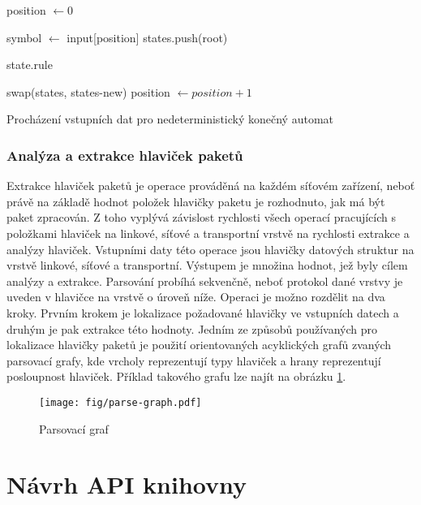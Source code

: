 \begin{algorithm}
    position $\leftarrow 0$\;
    {
        symbol $\leftarrow$ input[position]\;
        states.push(root)\;

        {
             {\Return state.rule}

        }

        swap(states, states-new)\;
        position $\leftarrow position + 1$\;
    }
    \caption{Procházení vstupních dat pro nedeterministický konečný automat}
    \label{alg:nfa}
\end{algorithm}

\subsection{Analýza a extrakce hlaviček paketů} %

Extrakce hlaviček paketů je operace prováděná na každém síťovém zařízení,
neboť právě na základě hodnot položek hlavičky paketu je rozhodnuto,
jak má být paket zpracován. Z toho vyplývá závislost rychlosti všech operací pracujících s položkami hlaviček na linkové, síťové a transportní vrstvě na rychlosti extrakce a analýzy hlaviček.
Vstupními daty této operace jsou hlavičky datových struktur na vrstvě linkové, síťové a transportní.
Výstupem je množina hodnot, jež byly cílem analýzy a extrakce.
Parsování probíhá sekvenčně, neboť protokol dané vrstvy je uveden v hlavičce na vrstvě o úroveň níže.
Operaci je možno rozdělit na dva kroky. Prvním krokem je lokalizace požadované hlavičky ve vstupních datech
a druhým je pak extrakce této hodnoty.
Jedním ze způsobů používaných pro lokalizace hlavičky paketů je použití orientovaných acyklických grafů zvaných parsovací grafy,
kde vrcholy reprezentují typy hlaviček a hrany reprezentují posloupnost hlaviček.
Příklad takového grafu lze najít na obrázku \ref{fig:parse-graph}.


\begin{figure}[!htbp]
    \centering
    \texttt{[image: fig/parse-graph.pdf]}
    \caption{Parsovací graf}
    \label{fig:parse-graph}
\end{figure}

\chapter{Návrh API knihovny}\label{chapter:api} %

